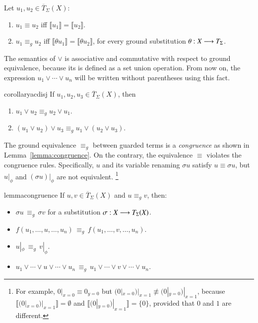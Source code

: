 \begin{definition}
  Let $u_1, u_2 \in \overline{T}_{\Sigma}(X)$:
  \begin{enumerate}
  \item $u_1 \equiv u_2$ iff $\llbracket u_1 \rrbracket = \llbracket u_2 \rrbracket$.
  \item $u_1 \equiv_g u_2$ iff $\llbracket \theta u_1 \rrbracket =
    \llbracket \theta u_2 \rrbracket$, for every ground substitution
    $\theta : X \longrightarrow T_\Sigma$.
  \end{enumerate}
\end{definition}


The semantics of $\vee$ is associative and commutative with respect to
ground equivalence, because its is defined as a set union operation.
From now on, the expression $u_1 \vee \cdots \vee u_n$ will be written
without parentheses using this fact.


\begin{restatable}{corollary}{acdisj}
  If $u_1, u_2, u_3 \in \overline{T}_{\Sigma}(X)$, then 
  \begin{enumerate}
	\item $u_1 \vee u_2 \equiv_g u_2 \vee u_1$.
  	\item $(u_1 \vee u_2) \vee u_3 \equiv_g u_1\vee (u_2 \vee u_3)$.
  \end{enumerate}

\end{restatable}



The ground equivalence $\equiv_g$ between guarded terms  is a \emph{congruence} as shown in
Lemma~\ref{lemma:congruence}. On the contrary, the equivalence
$\equiv$ violates the congruence rules.  Specifically, $u$ and its
variable renaming $\sigma u$ satisfy $u \equiv \sigma u$, but $u
|_\phi$ and $(\sigma u) |_\phi$ are not equivalent.%
\footnote{For example, $0 |_{x = 0}
\equiv 0_{y = 0}$ but $(0 |_{x = 0}) |_{x = 1} \not\equiv (0 |_{y =
  0}) |_{x = 1}$, because $\llbracket (0 |_{x = 0}) |_{x = 1}
\rrbracket = \emptyset$ and $\llbracket (0 |_{y = 0}) |_{x = 1}
\rrbracket = \{0\}$, provided that $0$ and $1$ are different.}

\begin{restatable}{lemma}{congruence}\label{lemma:congruence}
If $u,v \in \overline{T}_{\Sigma}(X)$ and $u \equiv_g v$, then:
\begin{itemize}
	\item $\sigma u \,\equiv_g\, \sigma v$ for a substitution $\sigma : X \longrightarrow T_\Sigma(X)$.		
	\item $f(u_1, \ldots, u, \ldots, u_n) \,\equiv_g\, f(u_1, \ldots, v, \ldots, u_n)$.
	\item $u |_\phi \,\equiv_g\, v |_\phi$.
	\item $u_1 \vee \cdots \vee u \vee \cdots \vee u_n \,\equiv_g\, u_1 \vee \cdots \vee v \vee \cdots \vee u_n$.
\end{itemize}
\end{restatable}


